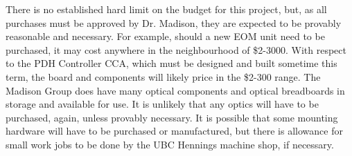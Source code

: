 There is no established hard limit on the budget for this project, but, as all
purchases must be approved by Dr. Madison, they are expected to be provably
reasonable and necessary. For example, should a new EOM unit need to be
purchased, it may cost anywhere in the neighbourhood of \$2-3000. With respect
to the PDH Controller CCA, which must be designed and built sometime this
term, the board and components will likely price in the \$2-300 range.
The Madison Group does have many optical components and optical breadboards
in storage and available for use. It is unlikely that any optics will have to
be purchased, again, unless provably necessary. It is possible that some
mounting hardware will have to be purchased or manufactured, but there is
allowance for small work jobs to be done by the UBC Hennings machine shop,
if necessary.
